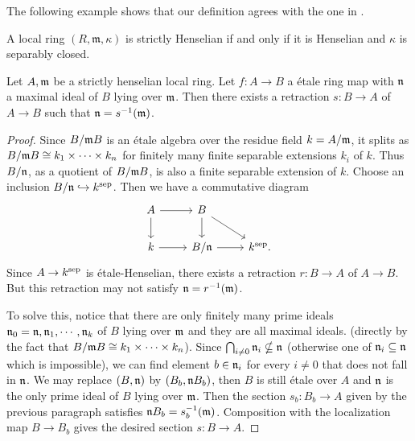 The following example shows that our definition agrees with the one in
\cite[\href{https://stacks.math.columbia.edu/tag/04GF}{Tag 04GF}]{stacks-project}.

\begin{example}
    A local ring $(R, \mathfrak{m}, \kappa)$ is strictly Henselian if and only if it is Henselian and $\kappa$ is separably closed.
\end{example}

\begin{proposition}
    \label{thm:strictly-henselian-good-retraction}
    Let \(A, {\mathfrak{m}}\) be a strictly henselian local ring. Let \(f : A \to B\) a \'etale ring map with \({\mathfrak{n}}\) a maximal ideal of \(B\) lying over \({\mathfrak{m}}\). Then there exists a retraction \(s : B \to A\) of \(A \to B\) such that \({\mathfrak{n}} = s^{-1}({\mathfrak{m}})\).
\end{proposition}

\begin{proof}
  Since \(B/{\mathfrak{m}} B\) is an étale algebra over the residue field \(k = A/{\mathfrak{m}}\), it splits as \(B/{\mathfrak{m}} B \cong k_1 \times \cdots \times k_n\) for finitely many finite separable extensions \(k_i\) of \(k\). Thus \(B/{\mathfrak{n}}\), as a quotient of \(B/{\mathfrak{m}} B\), is also a finite separable extension of \(k\). Choose an inclusion \(B/{\mathfrak{n}} \hookrightarrow k^{\textnormal{sep}}\). Then we have a commutative diagram
  \[
  \begin{tikzcd}
    A \arrow{r} \arrow{d} & B \arrow{d}\arrow{rd} & \\
    k \arrow{r} & B/\n \arrow{r} & k^{\sep}.
  \end{tikzcd}
  \]
  Since \(A \to k^{\textnormal{sep}}\) is étale-Henselian, there exists a retraction \(r : B \to A\) of \(A \to B\). But this retraction may not satisfy \({\mathfrak{n}} = r^{-1}({\mathfrak{m}})\). 
  
  To solve this, notice that there are only finitely many prime ideals \({\mathfrak{n}}_0 = {\mathfrak{n}}, {\mathfrak{n}}_1, \cdots, {\mathfrak{n}}_k\) of \(B\) lying over \({\mathfrak{m}}\) and they are all maximal ideals. (directly by the fact that \(B/{\mathfrak{m}} B \cong k_1 \times \cdots \times k_n\)). Since \(\bigcap_{i \ne 0} {\mathfrak{n}}_i \nsubseteq {\mathfrak{n}}\) (otherwise one of \({\mathfrak{n}}_i \subseteq {\mathfrak{n}}\) which is impossible), we can find element \(b \in {\mathfrak{n}}_i\) for every \(i \ne 0\) that does not fall in ${\mathfrak{n}}$. We may replace \((B, {\mathfrak{n}})\) by \((B_b, {\mathfrak{n}} B_b)\), then \(B\) is still étale over \(A\) and \({\mathfrak{n}}\) is the only prime ideal of \(B\) lying over \({\mathfrak{m}}\). Then the section \(s_b : B_b \to A\) given by the previous paragraph satisfies \({\mathfrak{n}} B_b = s_b^{-1}({\mathfrak{m}})\). Composition with the localization map \(B \to B_b\) gives the desired section \(s : B \to A\).
\end{proof}


